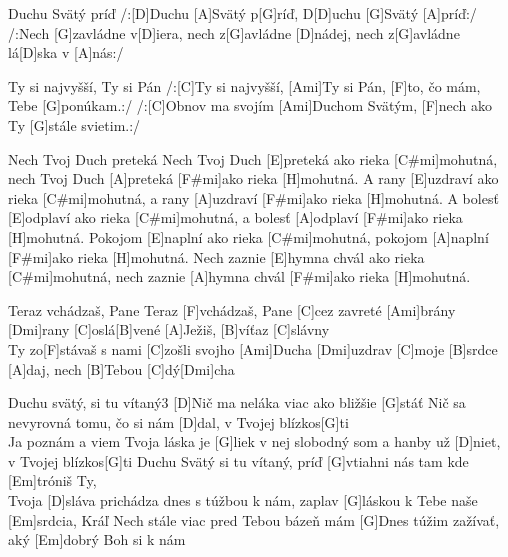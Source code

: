 \documentclass[12pt]{article}
\begin{document}
\begin{songgroup}{2}
	\begin{groupitem}{Duchu Svätý príď}
		/:[D]Duchu [A]Svätý p[G]ríď,
		D[D]uchu [G]Svätý [A]príď:/
		\\
		/:Nech [G]zavládne v[D]iera,
		nech z[G]avládne [D]nádej,
		nech z[G]avládne lá[D]ska v [A]nás:/
	\end{groupitem}
	\columnbreak
	\begin{groupitem}{Ty si najvyšší, Ty si Pán}
		/:[C]Ty si najvyšší, [Ami]Ty si Pán,
		[F]to, čo mám, Tebe [G]ponúkam.:/
		/:[C]Obnov ma svojím [Ami]Duchom Svätým,
		[F]nech ako Ty [G]stále svietim.:/
	\end{groupitem}
\end{songgroup}

\begin{songgroup}{2}
	\begin{groupitem}{Nech Tvoj Duch preteká}
		Nech Tvoj Duch [E]preteká ako rieka [C#mi]mohutná,
		nech Tvoj Duch [A]preteká [F#mi]ako rieka [H]mohutná.
		A rany [E]uzdraví ako rieka [C#mi]mohutná,
		a rany [A]uzdraví [F#mi]ako rieka [H]mohutná.
		A bolesť [E]odplaví ako rieka [C#mi]mohutná,
		a bolesť [A]odplaví [F#mi]ako rieka [H]mohutná.
		Pokojom [E]naplní ako rieka [C#mi]mohutná,
		pokojom [A]naplní [F#mi]ako rieka [H]mohutná.
		Nech zaznie [E]hymna chvál ako rieka 
		[C#mi]mohutná,
		nech zaznie [A]hymna chvál [F#mi]ako rieka 
		[H]mohutná.
	\end{groupitem}
	\columnbreak
	\begin{groupitem}{Teraz vchádzaš, Pane}
		Teraz [F]vchádzaš, Pane
		[C]cez zavreté [Ami]brány
		[Dmi]rany [C]oslá[B]vené
		[A]Ježiš, [B]víťaz [C]slávny
		\\
		Ty zo[F]stávaš s nami
		[C]zošli svojho [Ami]Ducha
		[Dmi]uzdrav [C]moje [B]srdce
		[A]daj, nech [B]Tebou [C]dý[Dmi]cha
	\end{groupitem}
\end{songgroup}

\begin{song}{Duchu svätý, si tu vítaný}{3}
	[D]Nič ma neláka viac
	ako bližšie [G]stáť
	Nič sa nevyrovná
	tomu, čo si nám [D]dal,
	v Tvojej blízkos[G]ti
	\\
	[D]Ja poznám a viem
	Tvoja láska je [G]liek
	v nej slobodný som
	a hanby už [D]niet,
	v Tvojej blízkos[G]ti
	\columnbreak
	[D]Duchu Svätý si tu vítaný,
	príď [G]vtiahni nás
	tam kde [Em]tróniš Ty,
	\\
	Tvoja [D]sláva prichádza dnes
	s túžbou k nám,
	zaplav [G]láskou k Tebe
	naše [Em]srdcia, Kráľ
	\columnbreak
	[D]Nech stále viac pred Tebou
	bázeň mám
	[G]Dnes túžim zažívať,
	aký [Em]dobrý Boh si k nám
\end{song}
\end{document}
